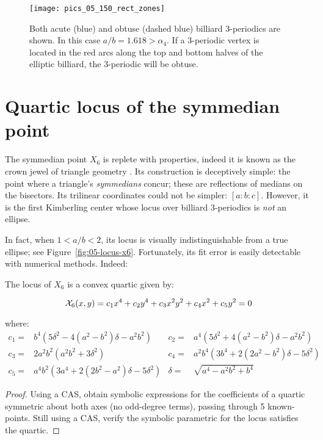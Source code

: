 \begin{figure}
    \centering
    \texttt{[image: pics\_05\_150\_rect\_zones]}
    \caption{Both acute (blue) and obtuse (dashed blue) billiard 3-periodics are shown. In this case $a/b=1.618>\alpha_4$. If a 3-periodic vertex is located in the red arcs along the top and bottom halves of the elliptic billiard, the 3-periodic will be obtuse.}
\label{fig:05-obtuse-zones}
\end{figure}


\section{Quartic locus of the symmedian point }
\label{sec:05-symmedian}

The symmedian point $X_6$ is replete with properties, indeed it is known as the crown jewel of triangle geometry \cite[Symmedian Point]{mw}. Its construction is deceptively simple: the point where a triangle's {\em symmedians} concur; these are reflections of medians on the bisectors. Its trilinear coordinates could not be simpler: $[a:b:c]$. However, it is the first Kimberling center whose locus over billiard 3-periodics is {\em not} an ellipse. 

In fact, when $1<a/b<2$, its locus is visually indistinguishable from a true ellipse; see Figure~\ref{fig:05-locus-x6}. Fortunately, its fit error is easily detectable with numerical methods. Indeed:

\begin{proposition}
The locus of $X_6$ is a convex quartic given by:

\begin{equation*}
  \mathcal{X}_6(x,y)=c_1 x^4+c_2 y^4+c_3 x^2 y^2+ c_4 x^2 + c_5 y^2 = 0
\end{equation*}

\noindent where:
$$
\begin{array}{rlrl}
c_1=&b^4(5\delta^2-4(a^2-b^2)\delta -a^2 b^2)&c_2=&a^4(5\delta^2+4(a^2-b^2)\delta-a^2b^2) \\
c_3=&2a^2 b^2(a^2 b^2+3\delta^2)&c_4=&a^2 b^4(3 b^4+2(2 a^2-b^2)\delta-5\delta^2)\\
c_5=&a^4 b^2(3 a^4+2(2 b^2-a^2)\delta-5\delta^2)&\delta=&\sqrt{a^4-a^2 b^2+b^4}
\end{array}
$$
\end{proposition}

\begin{proof}
Using a CAS, obtain symbolic expressions for the coefficients of a quartic symmetric about both axes (no odd-degree terms), passing through 5 known-points. Still using a CAS, verify the symbolic parametric for the locus satisfies the quartic.
\end{proof}

